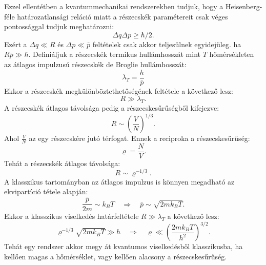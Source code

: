 \documentclass[../main.tex]{subfiles}
\begin{document}
Ezzel ellentétben a kvantummechanikai rendszerekben tudjuk, hogy a Heisenberg-féle határozatlansági reláció miatt a részecskék paramétereit csak véges pontossággal tudjuk meghatározni:
\begin{equation}
    \Delta q \Delta p \geq \hbar/2.
\end{equation}
Ezért a $\Delta q \ll R$ és $\Delta p \ll \bar{p}$ feltételek csak akkor teljesülnek egyidejüleg. ha $R \bar{p} \gg \hbar$. Definiáljuk a részecskék termikus hullámhosszát mint $T$
hőmérsékleten az átlagos impulzusú részecskék de Broglie hullámhosszát:
\begin{equation}
    \lambda_T = \frac{h}{\bar{p}}
\end{equation}
Ekkor a részecskék megkülönböztethetőségének feltétele a következő lesz:
\begin{equation}
    R \gg \lambda_T.
\end{equation}
A részecskék átlagos távolsága pedig a részecskesűrűségből kifejezve:
\begin{equation}
    R \sim \left( \frac{V}{N} \right)^{1/3}.
\end{equation}
Ahol $\frac{V}{N}$ az egy részecskére jutó térfogat. Ennek a reciproka a részecskesűrűség:
\begin{equation}
    \varrho = \frac{N}{V}.
\end{equation}
Tehát a részecskék átlagos távolsága:
\begin{equation}
    R \sim \varrho^{-1/3}.
\end{equation}
A klasszikus tartományban az átlagos impulzus is könnyen megadható az ekvipartíció tétele alapján:
\begin{equation}
    \frac{\bar{p}}{2m} \sim k_B T \quad \Rightarrow \quad \bar{p} \sim \sqrt{2 m k_B T}.
\end{equation}
Ekkor a klasszikus viselkedés határfeltétele $R \gg \lambda_T$ a következő lesz:
\begin{equation}
    \varrho^{-1/3} \sqrt{2m k_B T} \gg h \quad \Rightarrow \quad \varrho \ll \left( \frac{2m k_B T}{h^2} \right)^{3/2}.
\end{equation}
Tehát egy rendszer akkor megy át kvantumos viselkedésből klasszikusba, ha kellően magas a hőmérséklet, vagy kellően alacsony a részecskesűrűség.
\end{document}
